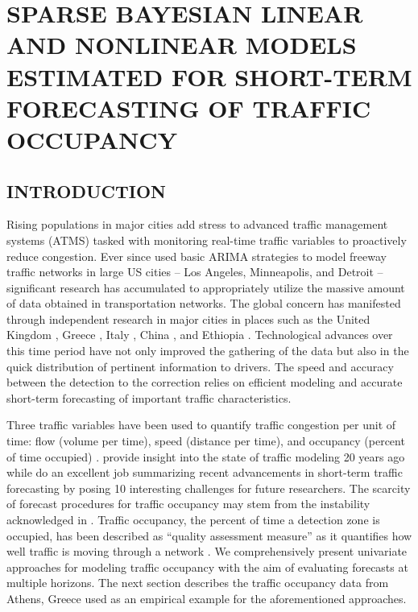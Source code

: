 \chapter{SPARSE BAYESIAN LINEAR AND NONLINEAR MODELS ESTIMATED FOR SHORT-TERM FORECASTING OF TRAFFIC OCCUPANCY}
\label{chap:traffic}
\section{INTRODUCTION}
Rising populations in major cities add stress to advanced traffic management systems (ATMS) tasked with monitoring real-time traffic variables to proactively reduce congestion. Ever since \cite{Ahmed1979} used basic ARIMA strategies to model freeway traffic networks in large US cities -- Los Angeles, Minneapolis, and Detroit -- significant research has accumulated to appropriately utilize the massive amount of data obtained in transportation networks. The global concern has manifested through independent research in major cities in places such as the United Kingdom \citep{Queen2009,Dunne2012}, Greece \citep{Stathopoulos2003, Kamarianakis2012,Theofilatos2017}, Italy \citep{Annunziato2013,Moretti2015}, China \citep{Shang2006,Jun2007,Min2010}, and Ethiopia \citep{Hellendoorn2011}. Technological advances over this time period have not only improved the gathering of the data but also in the quick distribution of pertinent information to drivers. The speed and accuracy between the detection to the correction relies on efficient modeling and accurate short-term forecasting of important traffic characteristics. 

Three traffic variables have been used to quantify traffic congestion per unit of time: flow (volume per time), speed (distance per time), and occupancy (percent of time occupied) \cite{Hall1992}. \cite{Smith1997} provide insight into the state of traffic modeling 20 years ago while \cite{Vlahogianni2014} do an excellent job summarizing recent advancements in short-term traffic forecasting by posing 10 interesting challenges for future researchers. The scarcity of forecast procedures for traffic occupancy may stem from the instability acknowledged in \cite{Levin1980}. Traffic occupancy, the percent of time a detection zone is occupied, has been described as ``quality assessment measure'' as it quantifies how well traffic is moving through a network \citep{Klein1996}.  We comprehensively present univariate approaches for modeling traffic occupancy with the aim of evaluating forecasts at multiple horizons. The next section describes the traffic occupancy data from Athens, Greece used as an empirical example for the aforementioned approaches.

